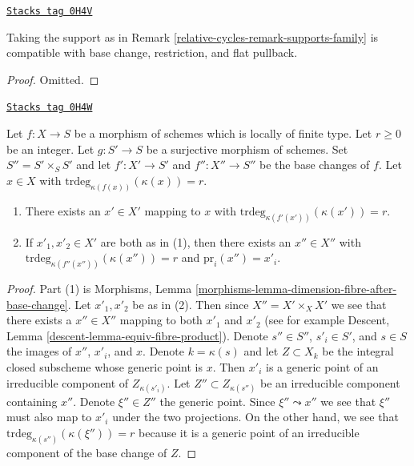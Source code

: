 \begin{lemma}
\label{relative-cycles-lemma-support-family}
\href{https://stacks.math.columbia.edu/tag/0H4V}{\texttt{Stacks tag 0H4V}}

Taking the support as in Remark \ref{relative-cycles-remark-supports-family}
is compatible with base change, restriction, and flat pullback.
\end{lemma}

\begin{proof}
Omitted.
\end{proof}

\begin{lemma}
\label{relative-cycles-lemma-coequalizer-dim-r}
\href{https://stacks.math.columbia.edu/tag/0H4W}{\texttt{Stacks tag 0H4W}}

Let $f : X \to S$ be a morphism of schemes which is locally of finite type.
Let $r \geq 0$ be an integer. Let $g : S' \to S$ be a surjective morphism of
schemes. Set $S'' = S' \times_S S'$ and let $f' : X' \to S'$
and $f'' : X'' \to S''$ be the base changes of $f$.
Let $x \in X$ with $\text{trdeg}_{\kappa(f(x))}(\kappa(x)) = r$.
\begin{enumerate}
\item There exists an $x' \in X'$ mapping to $x$
with $\text{trdeg}_{\kappa(f'(x'))}(\kappa(x')) = r$.
\item If $x'_1, x'_2 \in X'$ are both as in (1), then there
exists an $x'' \in X''$ with
$\text{trdeg}_{\kappa(f''(x''))}(\kappa(x'')) = r$ and
$\text{pr}_i(x'') = x'_i$.
\end{enumerate}
\end{lemma}

\begin{proof}
Part (1) is
Morphisms, Lemma \ref{morphisms-lemma-dimension-fibre-after-base-change}.
Let $x'_1, x'_2$ be as in (2). Then since $X'' = X' \times_X X'$
we see that there
exists a $x'' \in X''$ mapping to both $x'_1$ and $x'_2$ (see for
example Descent, Lemma \ref{descent-lemma-equiv-fibre-product}).
Denote $s'' \in S''$, $s'_i \in S'$, and $s \in S$ the images
of $x''$, $x'_i$, and $x$.
Denote $k = \kappa(s)$ and let $Z \subset X_k$ be the integral
closed subscheme whose generic point is $x$. Then $x'_i$
is a generic point of an irreducible component of $Z_{\kappa(s'_i)}$.
Let $Z'' \subset Z_{\kappa(s'')}$ be an irreducible component
containing $x''$. Denote $\xi'' \in Z''$ the generic point.
Since $\xi'' \leadsto x''$ we see that $\xi''$ must also
map to $x'_i$ under the two projections. On the other hand,
we see that $\text{trdeg}_{\kappa(s'')}(\kappa(\xi'')) = r$
because it is a generic
point of an irreducible component of the base change of $Z$.
\end{proof}


